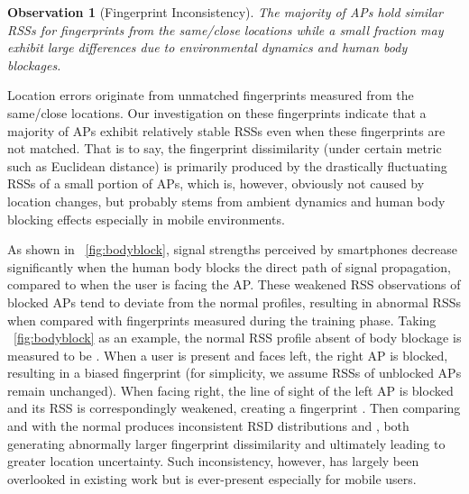 \documentclass[10pt,conference,compsocconf,letterpaper]{./sty/IEEEtran}
\newtheorem{obsv}{Observation}
\begin{document}
\begin{obsv}[Fingerprint Inconsistency]
\label{obs:DI}
The majority of APs hold similar RSSs for fingerprints from the same/close locations while a small fraction may exhibit large differences due to environmental dynamics and human body blockages.
\end{obsv}
Location errors originate from unmatched fingerprints measured from the same/close locations. Our investigation on these fingerprints indicate that a majority of APs exhibit relatively stable RSSs even when these fingerprints are not matched. That is to say, the fingerprint dissimilarity (under certain metric such as Euclidean distance) is primarily produced by the drastically fluctuating RSSs of a small portion of APs, which is, however, obviously not caused by location changes, but probably stems from ambient dynamics and human body blocking effects \cite{welch2002effects,zhang_i_2011} especially in mobile environments. 



As shown in \figurename~\ref{fig:bodyblock}, signal strengths perceived by smartphones decrease significantly when the human body blocks the direct path of signal propagation, compared to when the user is facing the AP. These weakened RSS observations of blocked APs tend to deviate from the normal profiles, resulting in abnormal RSSs when compared with fingerprints measured during the training phase. 
Taking \figurename~\ref{fig:bodyblock} as an example, the normal RSS profile absent of body blockage is measured to be . When a user is present and faces left, the right AP is blocked, resulting in a biased fingerprint  (for simplicity, we assume RSSs of unblocked APs remain unchanged). When facing right, the line of sight of the left AP is blocked and its RSS is correspondingly weakened, creating a fingerprint . Then comparing  and  with the normal  produces inconsistent RSD distributions  and , both generating abnormally larger fingerprint dissimilarity and ultimately leading to greater location uncertainty. Such inconsistency, however, has largely been overlooked in existing work but is ever-present especially for mobile users.
\end{document}
